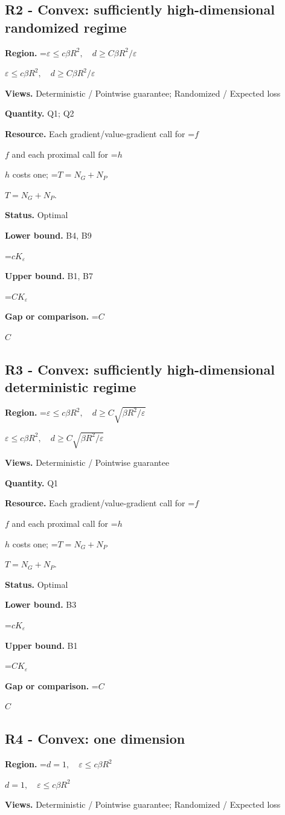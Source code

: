\documentclass[10pt,a4paper]{article}
\newcommand{\AtlasMath}[1]{\par\begingroup\centering\setbox0=\hbox{$\displaystyle #1$}\ifdim\wd0>1.4\linewidth\typeout{ATLAS WIDE FORMULA: \the\wd0}\fi\ifdim\wd0>\linewidth\resizebox{\linewidth}{!}{\box0}\else\box0\fi\par\endgroup}
\newcommand{\AtlasInlineMath}[1]{\begingroup\setbox0=\hbox{$#1$}\ifdim\wd0>.4\linewidth\endgroup\AtlasMath{#1}\else\endgroup$#1$\fi}
\begin{document}
\subsection{R2 - Convex: sufficiently high-dimensional randomized regime}
\textbf{Region.} \AtlasInlineMath{\varepsilon\le c\beta R^2,\quad d\ge C\beta R^2/\varepsilon}

\textbf{Views.} Deterministic / Pointwise guarantee; Randomized / Expected loss

\textbf{Quantity.} Q1; Q2

\textbf{Resource.} Each gradient/value-gradient call for \AtlasInlineMath{f} and each proximal call for \AtlasInlineMath{h} costs one; \AtlasInlineMath{T=N_G+N_P}.

\textbf{Status.} Optimal

\textbf{Lower bound.} B4, B9

\AtlasMath{cK_\varepsilon}
\textbf{Upper bound.} B1, B7

\AtlasMath{CK_\varepsilon}
\textbf{Gap or comparison.} \AtlasInlineMath{C}

\subsection{R3 - Convex: sufficiently high-dimensional deterministic regime}
\textbf{Region.} \AtlasInlineMath{\varepsilon\le c\beta R^2,\quad d\ge C\sqrt{\beta R^2/\varepsilon}}

\textbf{Views.} Deterministic / Pointwise guarantee

\textbf{Quantity.} Q1

\textbf{Resource.} Each gradient/value-gradient call for \AtlasInlineMath{f} and each proximal call for \AtlasInlineMath{h} costs one; \AtlasInlineMath{T=N_G+N_P}.

\textbf{Status.} Optimal

\textbf{Lower bound.} B3

\AtlasMath{cK_\varepsilon}
\textbf{Upper bound.} B1

\AtlasMath{CK_\varepsilon}
\textbf{Gap or comparison.} \AtlasInlineMath{C}

\subsection{R4 - Convex: one dimension}
\textbf{Region.} \AtlasInlineMath{d=1,\quad\varepsilon\le c\beta R^2}

\textbf{Views.} Deterministic / Pointwise guarantee; Randomized / Expected loss
\end{document}
